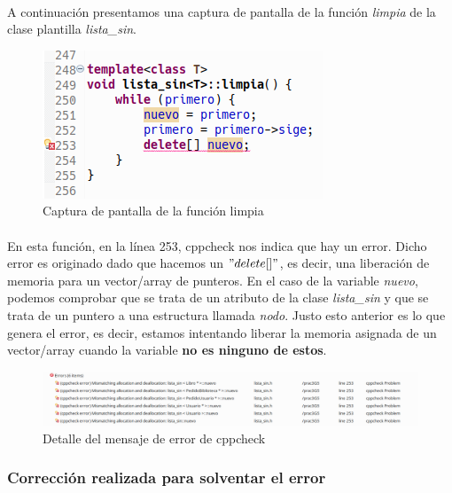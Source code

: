 			\paragraph{}A continuación presentamos una captura de pantalla de la función \textit{limpia} de la clase plantilla \textit{lista\_sin}.
		
			\begin{figure}[H]
				\centering
				\includegraphics[scale=0.7]{img/captura48.png}
				\caption{Captura de pantalla de la función limpia}
				\label{captura48}
			\end{figure}
	
			\paragraph{}En esta función, en la línea 253, cppcheck nos indica que hay un error. Dicho error es originado dado que hacemos un $"delete[]"$, es decir, una liberación de memoria para un vector/array de punteros. En el caso de la variable \textit{nuevo}, podemos comprobar que se trata de un atributo de la clase \textit{lista\_sin} y que se trata de un puntero a una estructura llamada \textit{nodo}. Justo esto anterior es lo que genera el error, es decir, estamos intentando liberar la memoria asignada de un vector/array cuando la variable \textbf{no es ninguno de estos}.
		
			\begin{figure}[H]
				\centering
				\includegraphics[scale=0.38]{img/captura49.png}
				\caption{Detalle del mensaje de error de cppcheck}
				\label{captura49}
			\end{figure}

		\subsubsection{Corrección realizada para solventar el error}
		
